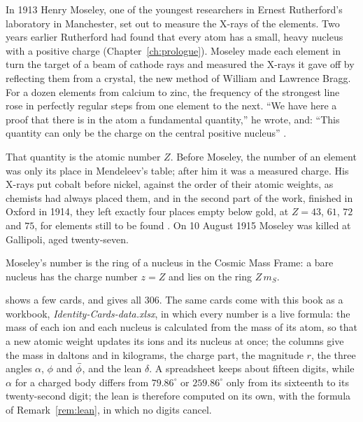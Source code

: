 
In 1913 Henry Moseley, one of the youngest researchers in Ernest Rutherford's laboratory in Manchester, set out to measure the X-rays of the elements. Two years earlier Rutherford had found that every atom has a small, heavy nucleus with a positive charge (Chapter~\ref{ch:prologue}). Moseley made each element in turn the target of a beam of cathode rays and measured the X-rays it gave off by reflecting them from a crystal, the new method of William and Lawrence Bragg. For a dozen elements from calcium to zinc, the frequency of the strongest line rose in perfectly regular steps from one element to the next. \enquote{We have here a proof that there is in the atom a fundamental quantity,} he wrote, and: \enquote{This quantity can only be the charge on the central positive nucleus} \citep{Moseley1913}.

That quantity is the atomic number $Z$. Before Moseley, the number of an element was only its place in Mendeleev's table; after him it was a measured charge. His X-rays put cobalt before nickel, against the order of their atomic weights, as chemists had always placed them, and in the second part of the work, finished in Oxford in 1914, they left exactly four places empty below gold, at $Z = 43$, $61$, $72$ and $75$, for elements still to be found \citep{Moseley1914}. On 10 August 1915 Moseley was killed at Gallipoli, aged twenty-seven.

Moseley's number is the ring of a nucleus in the Cosmic Mass Frame: a bare nucleus has the charge number $z = Z$ and lies on the ring $Z\,m_S$.

\begin{table}[tb]
\myfloatalign
\footnotesize
\makebox[\textwidth][c]{}
\caption[A few identity cards of matter]{A few identity cards of matter at $79.86^\circ$, out of the 306 of . The magnitude $r$ of a charged body is $|z|\,m_S$ to many digits; the angles are written with the lean $\delta$ of Remark~\ref{rem:lean}, which is far too small to be written as a plain decimal.}
\label{tab:sm-excerpt}
\end{table}

 shows a few cards, and  gives all 306. The same cards come with this book as a workbook, \emph{Identity-Cards-data.xlsx}, in which every number is a live formula: the mass of each ion and each nucleus is calculated from the mass of its atom, so that a new atomic weight updates its ions and its nucleus at once; the columns give the mass in daltons and in kilograms, the charge part, the magnitude $r$, the three angles $\alpha$, $\phi$ and $\bar{\phi}$, and the lean $\delta$. A spreadsheet keeps about fifteen digits, while $\alpha$ for a charged body differs from $79.86^\circ$ or $259.86^\circ$ only from its sixteenth to its twenty-second digit; the lean is therefore computed on its own, with the formula of Remark~\ref{rem:lean}, in which no digits cancel.

